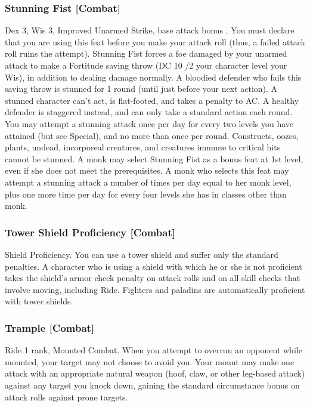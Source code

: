 \subsubsection{Stunning Fist [Combat]}
 Dex 3, Wis 3, Improved Unarmed Strike, base attack bonus .
 You must declare that you are using this feat before you make your attack roll (thus, a failed attack roll ruins the attempt). Stunning Fist forces a foe damaged by your unarmed attack to make a Fortitude saving throw (DC 10 /2 your character level \add your Wis), in addition to dealing damage normally. A bloodied defender who fails this saving throw is stunned for 1 round (until just before your next action). A stunned character can't act, is flat-footed, and takes a  penalty to AC. A healthy defender is staggered instead, and can only take a standard action each round. You may attempt a stunning attack once per day for every two levels you have attained (but see Special), and no more than once per round. Constructs, oozes, plants, undead, incorporeal creatures, and creatures immune to critical hits cannot be stunned.
 A monk may select Stunning Fist as a bonus feat at 1st level, even if she does not meet the prerequisites. A monk who selects this feat may attempt a stunning attack a number of times per day equal to her monk level, plus one more time per day for every four levels she has in classes other than monk.

\subsubsection{Tower Shield Proficiency [Combat]}
 Shield Proficiency.
 You can use a tower shield and suffer only the standard penalties.
 A character who is using a shield with which he or she is not proficient takes the shield's armor check penalty on attack rolls and on all skill checks that involve moving, including Ride.
 Fighters and paladins are automatically proficient with tower shields.

\subsubsection{Trample [Combat]}
 Ride 1 rank, Mounted Combat.
 When you attempt to overrun an opponent while mounted, your target may not choose to avoid you. Your mount may make one attack with an appropriate natural weapon (hoof, claw, or other leg-based attack) against any target you knock down, gaining the standard  circumstance bonus on attack rolls against prone targets.

